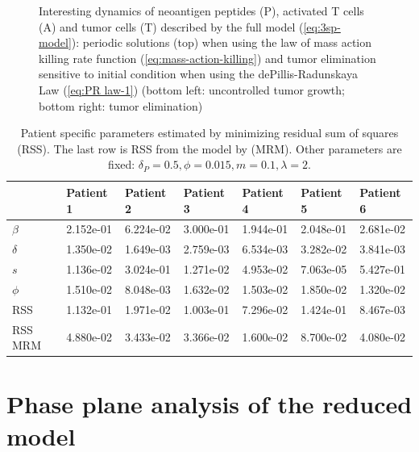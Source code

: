 \documentclass[review,authoryear]{elsarticle}
\begin{document}
\begin{figure}[h]
\caption{ \label{fig:tentative} Interesting dynamics of neoantigen peptides (P), activated T cells (A) and tumor cells (T)  described by the full model (\ref{eq:3sp-model}): periodic solutions (top) when using the law of mass action killing rate function (\ref{eq:mass-action-killing}) and tumor elimination sensitive to initial condition when using the dePillis-Radunskaya Law (\ref{eq:PR law-1}) (bottom left: uncontrolled tumor growth; bottom right: tumor elimination)}
\end{figure}

\begin{table}[!t]
\begin{center}
    \begin{tabular}{|m{2.0em}|l|l|l|l|l|l|}
    \hline
         & Patient 1 & Patient 2 & Patient 3 & Patient 4 & Patient 5 & Patient 6 \\ \hline
        $\beta$  & 2.152e-01 & 6.224e-02 & 3.000e-01 & 1.944e-01 & 2.048e-01 & 2.681e-02 \\ \hline
        $\delta$ & 1.350e-02 & 1.649e-03 & 2.759e-03 & 6.534e-03 & 3.282e-02 & 3.841e-03 \\ \hline
        $s$      & 1.136e-02 & 3.024e-01 & 1.271e-02 & 4.953e-02 & 7.063e-05 & 5.427e-01 \\ \hline
        $\phi$   & 1.510e-02 & 8.048e-03 & 1.632e-02 & 1.503e-02 & 1.850e-02 & 1.320e-02  \\ \hline \hline
        RSS     & 1.132e-01 & 1.971e-02 & 1.003e-01 & 7.296e-02 & 1.424e-01 & 8.467e-03 \\ \hline
      RSS MRM & 4.880e-02 & 3.433e-02 & 3.366e-02 & 1.600e-02 & 8.700e-02 & 4.080e-02 \\ \hline
    \end{tabular}
\end{center}
\caption{\label{tab:parameters} Patient specific parameters estimated by minimizing residual sum of squares (RSS). The last row is RSS from the model by \cite{Messan2021} (MRM). Other parameters are fixed: $\delta_P=0.5,\phi=0.015,m=0.1,\lambda=2$. }
\end{table}

\section{Phase plane analysis of the reduced model \label{sec:Analysis-on-two}}
\end{document}
